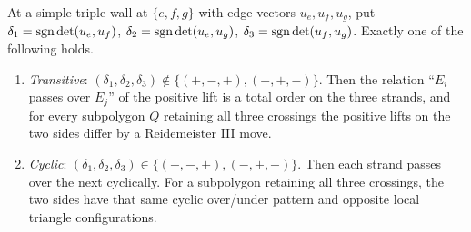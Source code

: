 \begin{lemma}\label{lem:triple-types}
At a simple triple wall at $\{e,f,g\}$ with edge vectors $u_e,u_f,u_g$, put
$\delta_1=\operatorname{sgn}\det(u_e,u_f)$, $\delta_2=\operatorname{sgn}\det(u_e,u_g)$,
$\delta_3=\operatorname{sgn}\det(u_f,u_g)$. Exactly one of the following holds.
\begin{enumerate}
\item[(i)] \emph{Transitive}: $(\delta_1,\delta_2,\delta_3)\notin\{(+,-,+),(-,+,-)\}$.
Then the relation ``$E_i$ passes over $E_j$'' of the positive lift is a total
order on the three strands, and for every subpolygon $Q$ retaining all three
crossings the positive lifts on the two sides differ by a Reidemeister III
move.
\item[(ii)] \emph{Cyclic}: $(\delta_1,\delta_2,\delta_3)\in\{(+,-,+),(-,+,-)\}$.
Then each strand passes over the next cyclically. For a subpolygon
retaining all three crossings, the two sides have that same cyclic
over/under pattern and opposite local triangle configurations.
\end{enumerate}
\end{lemma}
